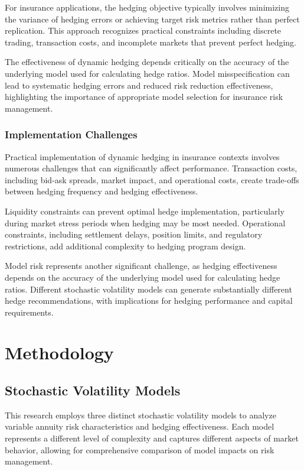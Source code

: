\documentclass[12pt,a4paper]{report}
\begin{document}
For insurance applications, the hedging objective typically involves minimizing the variance of hedging errors or achieving target risk metrics rather than perfect replication. This approach recognizes practical constraints including discrete trading, transaction costs, and incomplete markets that prevent perfect hedging.

The effectiveness of dynamic hedging depends critically on the accuracy of the underlying model used for calculating hedge ratios. Model misspecification can lead to systematic hedging errors and reduced risk reduction effectiveness, highlighting the importance of appropriate model selection for insurance risk management.

\subsection{Implementation Challenges}

Practical implementation of dynamic hedging in insurance contexts involves numerous challenges that can significantly affect performance. Transaction costs, including bid-ask spreads, market impact, and operational costs, create trade-offs between hedging frequency and hedging effectiveness.

Liquidity constraints can prevent optimal hedge implementation, particularly during market stress periods when hedging may be most needed. Operational constraints, including settlement delays, position limits, and regulatory restrictions, add additional complexity to hedging program design.

Model risk represents another significant challenge, as hedging effectiveness depends on the accuracy of the underlying model used for calculating hedge ratios. Different stochastic volatility models can generate substantially different hedge recommendations, with implications for hedging performance and capital requirements.

\chapter{Methodology}

\section{Stochastic Volatility Models}

This research employs three distinct stochastic volatility models to analyze variable annuity risk characteristics and hedging effectiveness. Each model represents a different level of complexity and captures different aspects of market behavior, allowing for comprehensive comparison of model impacts on risk management.
\end{document}
